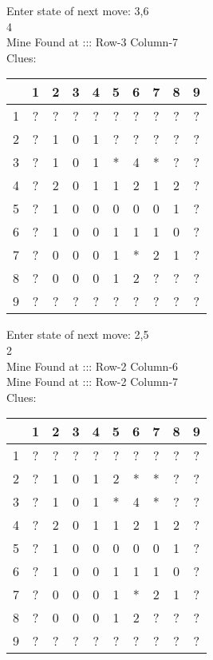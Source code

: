 Enter state of next move: 3,6\\
4\\
Mine Found at ::: Row-3 Column-7\\
Clues:\\
\begin{tabular}{|c|c|c|c|c|c|c|c|c|c|}
\hline
  & 1 & 2 & 3 & 4 & 5 & 6 & 7 & 8 & 9\\
\hline
1 & ? & ? & ? & ? & ? & ? & ? & ? & ?\\
\hline
2 & ? & 1 & 0 & 1 & ? & ? & ? & ? & ?\\
\hline
3 & ? & 1 & 0 & 1 & * & 4 & * & ? & ?\\
\hline
4 & ? & 2 & 0 & 1 & 1 & 2 & 1 & 2 & ?\\
\hline
5 & ? & 1 & 0 & 0 & 0 & 0 & 0 & 1 & ?\\
\hline
6 & ? & 1 & 0 & 0 & 1 & 1 & 1 & 0 & ?\\
\hline
7 & ? & 0 & 0 & 0 & 1 & * & 2 & 1 & ?\\
\hline
8 & ? & 0 & 0 & 0 & 1 & 2 & ? & ? & ?\\
\hline
9 & ? & ? & ? & ? & ? & ? & ? & ? & ?\\
\hline
\end{tabular}

Enter state of next move: 2,5\\
2\\
Mine Found at ::: Row-2 Column-6\\
Mine Found at ::: Row-2 Column-7\\
Clues:\\
\begin{tabular}{|c|c|c|c|c|c|c|c|c|c|}
\hline
  & 1 & 2 & 3 & 4 & 5 & 6 & 7 & 8 & 9\\
\hline
1 & ? & ? & ? & ? & ? & ? & ? & ? & ?\\
\hline
2 & ? & 1 & 0 & 1 & 2 & * & * & ? & ?\\
\hline
3 & ? & 1 & 0 & 1 & * & 4 & * & ? & ?\\
\hline
4 & ? & 2 & 0 & 1 & 1 & 2 & 1 & 2 & ?\\
\hline
5 & ? & 1 & 0 & 0 & 0 & 0 & 0 & 1 & ?\\
\hline
6 & ? & 1 & 0 & 0 & 1 & 1 & 1 & 0 & ?\\
\hline
7 & ? & 0 & 0 & 0 & 1 & * & 2 & 1 & ?\\
\hline
8 & ? & 0 & 0 & 0 & 1 & 2 & ? & ? & ?\\
\hline
9 & ? & ? & ? & ? & ? & ? & ? & ? & ?\\
\hline
\end{tabular}

